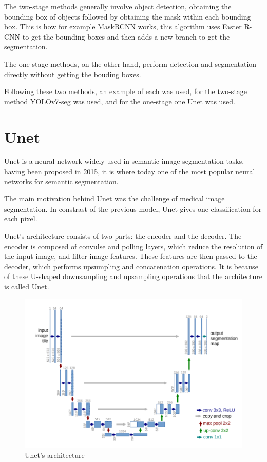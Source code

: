 The two-stage methods generally involve object detection, obtaining the bounding box of objects followed by obtaining the mask within each bounding box. This is how for example MaskRCNN works, this algorithm uses Faster R-CNN to get the bounding boxes and then adds a new branch to get the segmentation.

The one-stage methods, on the other hand, perform detection and segmentation directly without getting the bouding boxes.

Following these two methods, an example of each was used, for the two-stage method YOLOv7-seg was used, and for the one-stage one Unet was used.




\section{Unet}
Unet is a neural network widely used in semantic image segmentation tasks, having been proposed in 2015, it is where today one of the most popular neural networks for semantic segmentation.

The main motivation behind Unet was the challenge of medical image segmentation\cite{unetpaper}.
In constrast of the previous model, Unet gives one classification for each pixel.

Unet's architecture consists of two parts: the encoder and the decoder. The encoder is composed of convulse and polling layers, which reduce the resolution of the input image, and filter image features. These features are then passed to the decoder, which performs upsumpling and concatenation operations. It is because of these U-shaped downsampling and upsampling operations that the architecture is called Unet.

\begin{figure}[H]
\centering
\includegraphics[width=15cm]{images/unetarquitetura.png}
\caption{Unet's architecture\cite{unetpaper}}
\end{figure}

